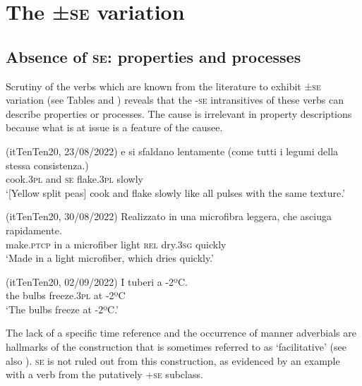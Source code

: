 \documentclass[output=paper,colorlinks,citecolor=brown
]{langscibook}
\begin{document}
\section{The ±\textsc{se} variation}
\label{bentley_section_4}
\subsection{Absence of \textsc{se}: properties and processes}
\label{bentley_section_4.1}
Scrutiny of the verbs which are known from the literature to exhibit ±\textsc{se} variation (see Tables  and ) reveals that the -\textsc{se} intransitives of these verbs can describe properties or processes. The cause is irrelevant in property descriptions because what is at issue is a feature of the causee. 

\hspace*{\fill}(itTenTen20, 23/08/2022)\quad
\ea \label{bentley_example_20}
    \gll {} e			si		sfaldano		lentamente (come tutti i legumi della stessa consistenza.)    \\
    cook.3\textsc{pl}		and	\textsc{se}		flake.3\textsc{pl}		slowly {}\\
    \glt ‘[Yellow split peas] cook and flake slowly like all pulses with the same texture.’
\z

\hspace*{\fill}(itTenTen20, 30/08/2022)\quad
\ea \label{bentley_example_21}
    \gll Realizzato	in una microfibra		leggera,	che			asciuga		rapidamente. \\
    make.\textsc{ptcp}	in	a				microfiber		light				\textsc{rel}		dry.3\textsc{sg}		quickly \\
    \glt ‘Made in a light microfiber, which dries quickly.’
\z

\hspace*{\fill}(itTenTen20, 02/09/2022)\quad
\ea \label{bentley_example_22}
    \gll I tuberi  a -2ºC.\\
    	the		bulbs		freeze.3\textsc{pl}		at		-2ºC \\
    \glt ‘The bulbs freeze at -2ºC.’
\z


The lack of a specific time reference and the occurrence of manner adverbials are hallmarks of the construction that is sometimes referred to as ‘facilitative’ \citep[147—149]{kemmer1993middle} (see also \cite[25—26]{levin1993english}). \textsc{se} is not ruled out from this construction, as evidenced by an example with a verb from the putatively +\textsc{se} subclass.
\end{document}
